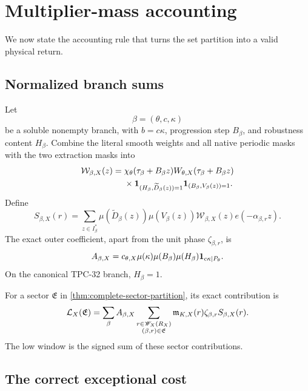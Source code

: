 \section{Multiplier-mass accounting}
\label{sec:multiplier-mass-ledger}

We now state the accounting rule that turns the set partition into a
valid physical return.

\subsection{Normalized branch sums}

Let
\[
 \beta=(\theta,c,\kappa)
\]
be a soluble nonempty branch, with \(b=c\kappa\), progression step
\(B_\beta\), and robustness content \(H_\beta\).  Combine the
literal smooth weights and all native periodic masks with the two
extraction masks into
\begin{align}
 \mathcal W_{\beta,X}(z)
 ={}&
 \chi_\theta(\tau_\beta+B_\beta z)
 W_{\theta,X}(\tau_\beta+B_\beta z)
\notag\\
 &\times
 \mathbf 1_{(H_\beta,\widetilde D_\beta(z))=1}
 \mathbf 1_{(B_\beta,V_\beta(z))=1}.
\label{eq:normalized-branch-weight}
\end{align}
Define
\begin{equation}
 S_{\beta,X}(r)
 =
 \sum_{z\in I_\beta^\ast}
 \mu(\widetilde D_\beta(z))\mu(V_\beta(z))
 \mathcal W_{\beta,X}(z)e(-\alpha_{\beta,r}z).
\label{eq:normalized-branch-sum}
\end{equation}
The exact outer coefficient, apart from the unit phase
\(\zeta_{\beta,r}\), is
\begin{equation}
 A_{\beta,X}
 =
 c_{\theta,X}\mu(\kappa)\mu(B_\beta)\mu(H_\beta)
 \mathbf 1_{c\kappa\mid P_\theta}.
\label{eq:normalized-outer-coefficient}
\end{equation}
On the canonical TPC-32 branch, \(H_\beta=1\).

For a sector \(\mathfrak E\) in
\cref{thm:complete-sector-partition}, its exact contribution is
\begin{equation}
 \mathcal L_X(\mathfrak E)
 =
 \sum_{\beta}
 A_{\beta,X}
 \sum_{\substack{r\in\mathscr W_X(R_X)\\
                 (\beta,r)\in\mathfrak E}}
 \mathfrak m_{K,X}(r)\zeta_{\beta,r}
 S_{\beta,X}(r).
\label{eq:exact-sector-contribution}
\end{equation}
The low window is the signed sum of these sector contributions.

\subsection{The correct exceptional cost}

